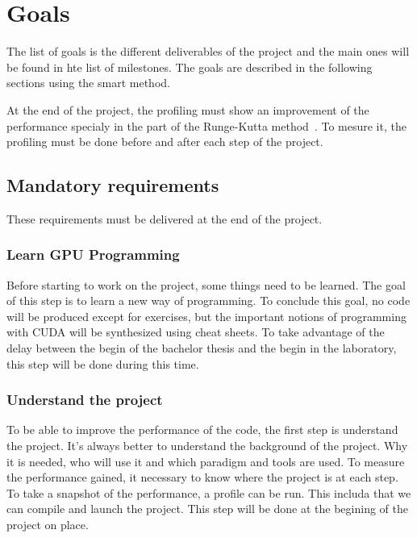 \chapter{Goals}
\label{spec:ch:goals}

The list of goals is the different deliverables of the project and the main ones will be found in hte list of milestones.
The goals are described in the following sections using the \acrshort{smart} method.

At the end of the project, the profiling must show an improvement of the performance specialy in the part of the Runge-Kutta method~\cite{Runge-Kutta-methods}.
To mesure it, the profiling must be done before and after each step of the project.


\section{Mandatory requirements}
\label{spec:ch:goals:mandatory-requirements}

These requirements must be delivered at the end of the project.


\subsection{Learn GPU Programming}
\label{spec:ch:goals:mandatory-requirements:learn-gpu-programming}

Before starting to work on the project, some things need to be learned.
The goal of this step is to learn a new way of programming.
To conclude this goal, no code will be produced except for exercises, but the important notions of programming with CUDA will be synthesized using cheat sheets.
To take advantage of the delay between the begin of the bachelor thesis and the begin in the laboratory, this step will be done during this time.


\subsection{Understand the project}
\label{spec:ch:goals:mandatory-requirements:understand-the-project}

To be able to improve the performance of the code, the first step is understand the project.
It's always better to understand the background of the project.
Why it is needed, who will use it and which paradigm and tools are used.
To measure the performance gained, it necessary to know where the project is at each step.
To take a snapshot of the performance, a profile can be run.
This includa that we can compile and launch the project.
This step will be done at the begining of the project on place.

